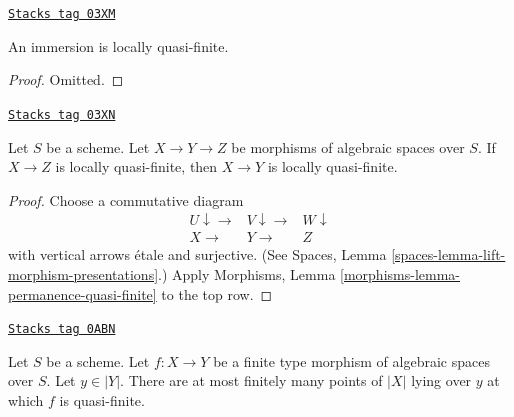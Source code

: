 \begin{lemma}
\label{spaces-morphisms-lemma-immersion-quasi-finite}
\href{https://stacks.math.columbia.edu/tag/03XM}{\texttt{Stacks tag 03XM}}

An immersion is locally quasi-finite.
\end{lemma}

\begin{proof}
Omitted.
\end{proof}

\begin{lemma}
\label{spaces-morphisms-lemma-permanence-quasi-finite}
\href{https://stacks.math.columbia.edu/tag/03XN}{\texttt{Stacks tag 03XN}}

Let $S$ be a scheme.
Let $X \to Y \to Z$ be morphisms of algebraic spaces over $S$.
If $X \to Z$ is locally quasi-finite, then $X \to Y$
is locally quasi-finite.
\end{lemma}

\begin{proof}
Choose a commutative diagram
$$
\begin{array}{ccc}U \downarrow\longrightarrow & V \downarrow\longrightarrow & W \downarrow \\ X \longrightarrow & Y \longrightarrow & Z\end{array}
$$
with vertical arrows \'etale and surjective. (See
Spaces, Lemma \ref{spaces-lemma-lift-morphism-presentations}.)
Apply
Morphisms, Lemma \ref{morphisms-lemma-permanence-quasi-finite}
to the top row.
\end{proof}

\begin{lemma}
\label{spaces-morphisms-lemma-quasi-finite-at-a-finite-number-of-points}
\href{https://stacks.math.columbia.edu/tag/0ABN}{\texttt{Stacks tag 0ABN}}

Let $S$ be a scheme. Let $f : X \to Y$ be a finite type
morphism of algebraic spaces over $S$. Let $y \in |Y|$.
There are at most finitely many
points of $|X|$ lying over $y$ at which $f$ is quasi-finite.
\end{lemma}

